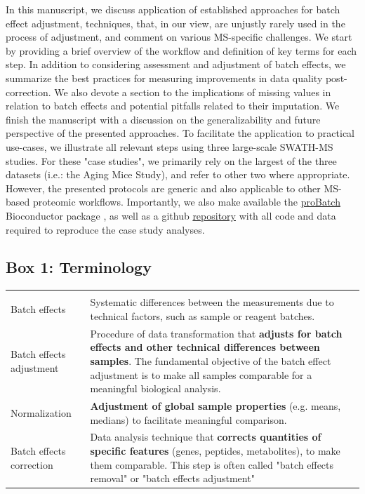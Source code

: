 \documentclass[num-refs]{wiley-article}
\begin{document}
In this manuscript, we discuss application of established approaches for batch effect adjustment, techniques, that, in our view, are unjustly rarely used in the process of adjustment, and comment on various MS-specific challenges. We start by providing a brief overview of the workflow and definition of key terms for each step. In addition to considering assessment and adjustment of batch effects, we summarize the best practices for measuring improvements in data quality post-correction. We also devote a section to the implications of missing values in relation to batch effects and potential pitfalls related to their imputation. We finish the manuscript with a discussion on the generalizability and future perspective of the presented approaches. To facilitate the application to practical use-cases, we illustrate all relevant steps using three large-scale SWATH-MS studies. For these "case studies", we primarily rely on the largest of the three datasets (i.e.: the Aging Mice Study), and refer to other two where appropriate. However, the presented protocols are generic and also applicable to other MS-based proteomic workflows. Importantly, we also make available the \href{https://bioconductor.org/packages/release/bioc/html/proBatch.html}{proBatch} Bioconductor package , as well as a github  \href{https://github.com/symbioticMe/batch_effects_workflow_code}{repository} with all code and data required to reproduce the case study analyses.


\begin{table}[ht]
\begin{tcolorbox}
	\section*{Box 1: Terminology}
	\label{box:Box1_definitions}
	\begin{tabular}{>{\raggedright}p{2cm}m{10.5cm}}
		\headrow
		\thead{Term} & \thead{Definition} \\
		Batch effects & Systematic differences between the measurements due to technical factors, such as sample or reagent batches.  \\
		Batch effects adjustment & Procedure of data transformation that \textbf{adjusts for batch effects and other technical differences between samples}. The fundamental objective of the batch effect adjustment is to make all samples comparable for a meaningful biological analysis. \\
		Normalization & \textbf{Adjustment of global sample properties} (e.g. means, medians) to facilitate meaningful comparison. \\
		Batch effects correction & Data analysis technique that \textbf{corrects quantities of specific features} (genes, peptides, metabolites), to make them comparable. This step is often called "batch effects removal" or "batch effects adjustment" \\
		\hline  %
	\end{tabular}
	
\end{tcolorbox}
\end{table}
\end{document}
